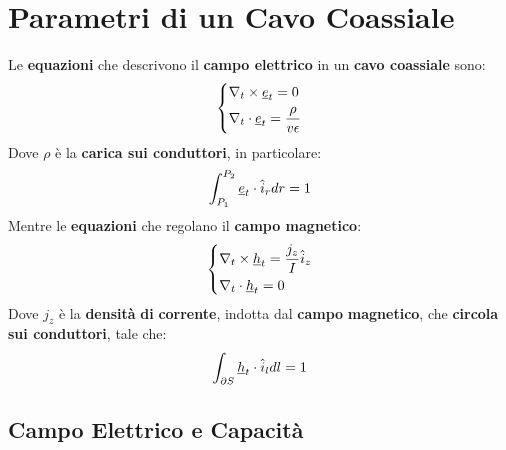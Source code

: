 \chapter{Parametri di un Cavo Coassiale}
Le \textbf{equazioni} che descrivono il \textbf{campo elettrico} in un \textbf{cavo coassiale} sono:
\begin{equation*}
\begin{dcases}
    \nabla_t \times \underline{e}_t = 0\\
    \nabla_t \cdot \underline{e}_t = \frac{\rho}{v \epsilon}
\end{dcases}
\end{equation*}
Dove $\rho$ è la \textbf{carica sui conduttori}, in particolare:
\begin{equation*}
    \int_{P_1}^{P_2} \underline{e}_t \cdot \hat{i}_r dr =1
\end{equation*}
Mentre le \textbf{equazioni} che regolano il \textbf{campo magnetico}:
\begin{equation*}
\begin{dcases}
    \nabla_t \times \underline{h}_t = \frac{j_z}{I} \hat{i}_z \\
    \nabla_t \cdot \underline{h}_t = 0
\end{dcases}
\end{equation*}
Dove $j_z$ è la \textbf{densità} \textbf{di} \textbf{corrente}, indotta dal \textbf{campo} \textbf{magnetico}, che \textbf{circola sui conduttori}, tale che:
\begin{equation*}
    \int_{\partial S} \underline{h}_t \cdot \hat{i}_l dl = 1
\end{equation*}
\section{Campo Elettrico e Capacità}
